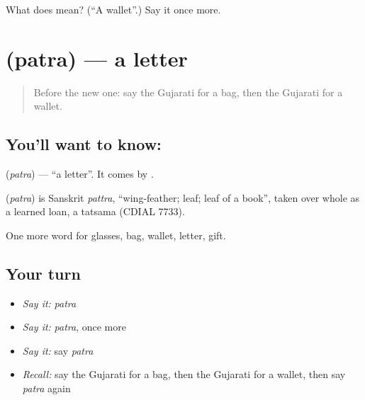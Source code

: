 \begin{tcolorbox}[breakable,colback=teal!4,colframe=teal!35!black,title={Before you move on}]
What does  mean? (\textquotedblleft{}A wallet\textquotedblright{}.) Say it once more.
\end{tcolorbox}
\section[\texorpdfstring{\gu{પત્ર} (patra)}{પત્ર (patra)}]{ (patra) — a letter}

\label{lesson:GU-C88-letter}



\begin{quote}
Before the new one: say the Gujarati for a bag, then the Gujarati for a wallet.
\end{quote}

\subsection*{You'll want to know: }
\textbf{} (\emph{patra}) — \textquotedblleft{}a letter\textquotedblright{}. It comes by \textbf{}.

\begin{cousinweb}
\textbf{} (\emph{patra}) is Sanskrit \emph{pattra}, \textquotedblleft{}wing-feather; leaf; leaf of a book\textquotedblright{}, taken over whole as a learned loan, a tatsama (CDIAL 7733).
\end{cousinweb}

\begin{grammarlens}[title={What you've built}]
One more word for glasses, bag, wallet, letter, gift.
\end{grammarlens}

\subsection*{Your turn}
\begin{itemize}
\raggedright
  \item \emph{Say it:} \emph{patra}
  \item \emph{Say it:} \emph{patra}, once more
  \item \emph{Say it:} say \emph{patra}
  \item \emph{Recall:} say the Gujarati for a bag, then the Gujarati for a wallet, then say \emph{patra} again
\end{itemize}

